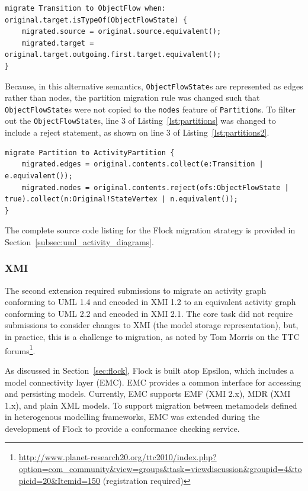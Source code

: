 \begin{lstlisting}[caption=Migrating ObjectFlowStates to a single ObjectFlow, label=lst:objectflows2, language=Flock]
migrate Transition to ObjectFlow when: original.target.isTypeOf(ObjectFlowState) {
	migrated.source = original.source.equivalent();
	migrated.target = original.target.outgoing.first.target.equivalent();
}
\end{lstlisting}

Because, in this alternative semantics, \texttt{ObjectFlowState}s are represented as edges rather than nodes, the partition migration rule was changed such that \texttt{ObjectFlowState}s were not copied to the \texttt{nodes} feature of \texttt{Partition}s. To filter out the \texttt{ObjectFlowState}s, line 3 of Listing~\ref{lst:partitions} was changed to include a reject statement, as shown on line 3 of Listing~\ref{lst:partitions2}.

\begin{lstlisting}[caption=Migrating Partitions without ObjectFlowStates, label=lst:partitions2, language=Flock]
migrate Partition to ActivityPartition {
	migrated.edges = original.contents.collect(e:Transition | e.equivalent());
	migrated.nodes = original.contents.reject(ofs:ObjectFlowState | true).collect(n:Original!StateVertex | n.equivalent());	
}
\end{lstlisting}

The complete source code listing for the Flock migration strategy is provided in Section~\ref{subsec:uml_activity_diagrams}.

\subsubsection{XMI}
\label{sec:xmi}
The second extension required submissions to migrate an activity graph conforming to UML 1.4 and encoded in XMI 1.2 to an equivalent activity graph conforming to UML 2.2 and encoded in XMI 2.1. The core task did not require submissions to consider changes to XMI (the model storage representation), but, in practice, this is a challenge to migration, as noted by Tom Morris on the TTC forums\footnote{\url{http://www.planet-research20.org/ttc2010/index.php?option=com_community&view=groups&task=viewdiscussion&groupid=4&topicid=20&Itemid=150} (registration required)}.

As discussed in Section~\ref{sec:flock}, Flock is built atop Epsilon, which includes a model connectivity layer (EMC). EMC provides a common interface for accessing and persisting models. Currently, EMC supports EMF (XMI 2.x), MDR (XMI 1.x), and plain XML models. To support migration between metamodels defined in heterogenous modelling frameworks, EMC was extended during the development of Flock to provide a conformance checking service.

